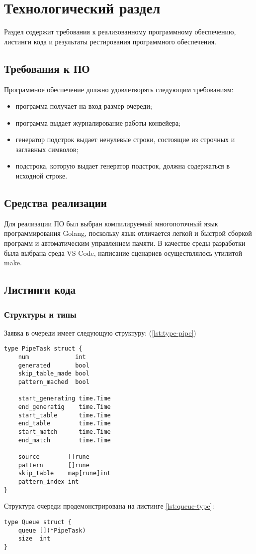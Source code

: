 \chapter{Технологический раздел}\label{sec:impl}
Раздел содержит требования к реализованному программному обеспечению, листинги кода и результаты рестирования программного обеспечения. 
\section{Требования к ПО}

Программное обеспечение должно удовлетворять следующим требованиям:
\begin{itemize}
	\item программа получает на вход размер очереди;
	\item программа выдает журналирование работы конвейера;
	\item генератор подстрок выдает ненулевые строки, состоящие из строчных и заглавных символов;
	\item подстрока, которую выдает генератор подстрок, должна содержаться в исходной строке.
\end{itemize}

\section{Средства реализации} 

Для реализации ПО был выбран компилируемый многопоточный язык программирования Golang, поскольку язык отличается легкой и быстрой сборкой программ и автоматическим управлением памяти.
В качестве среды разработки была выбрана среда VS Code, написание сценариев осуществлялось утилитой make.

\section{Листинги кода}
\subsection{Структуры и типы}
Заявка в очереди имеет следующую структуру: (\ref{lst:type-pipe})
\captionsetup{singlelinecheck = false, justification=raggedright}
\begin{lstlisting}[label=lst:type-pipe,caption=Структура заявки в очереди]
type PipeTask struct {
	num  			int
	generated		bool
	skip_table_made bool
	pattern_mached	bool
	
	start_generating time.Time
	end_generatig    time.Time
	start_table		 time.Time
	end_table		 time.Time
	start_match		 time.Time
	end_match		 time.Time

	source        []rune
	pattern       []rune
	skip_table    map[rune]int
	pattern_index int
}
\end{lstlisting}
Структура очереди продемонстрирована на листинге \ref{lst:queue-type}:
\begin{lstlisting}[label=lst:queue-type,caption=Структура очереди]
type Queue struct {
	queue [](*PipeTask)
	size  int
}
\end{lstlisting}

